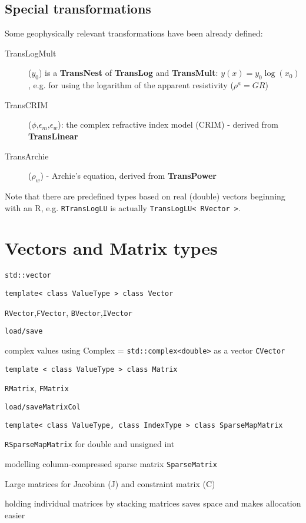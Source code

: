 \subsection*{Special transformations}
Some geophysically relevant transformations have been already defined:
\begin{description}
\item[TransLogMult]($y_0$) is a {\bf TransNest} of {\bf TransLog} and {\bf TransMult}: $y(x)=y_0\log(x_0)$, e.g. for using the logarithm of the apparent resistivity ($\rho^a=G R$)
\item[TransCRIM]($\phi$,$\epsilon_m$,$\epsilon_w$): the complex refractive index model (CRIM) - derived from {\bf TransLinear}
\item[TransArchie]($\rho_w$) - Archie's equation, derived from {\bf TransPower}
\end{description}

Note that there are predefined types based on real (double) vectors beginning with an R, e.g. \lstinline|RTransLogLU| is actually \lstinline|TransLogLU< RVector >|.


\section{Vectors and Matrix types}\label{app:matrix}
\sperre

\lstinline|std::vector|

\lstinline|template< class ValueType > class Vector|

\lstinline|RVector|,\lstinline|FVector|, \lstinline|BVector|,\lstinline|IVector|

\lstinline|load/save|

complex values using Complex = \lstinline|std::complex<double>| as a vector \lstinline|CVector|

\lstinline|template < class ValueType > class Matrix|

\lstinline|RMatrix|, \lstinline|FMatrix|

\lstinline|load/saveMatrixCol|

\lstinline|template< class ValueType, class IndexType > class SparseMapMatrix|

\lstinline|RSparseMapMatrix| for double and unsigned int

modelling column-compressed sparse matrix \lstinline|SparseMatrix|

Large matrices for Jacobian (J) and constraint matrix (C)

holding individual matrices by stacking matrices saves space and makes allocation easier

